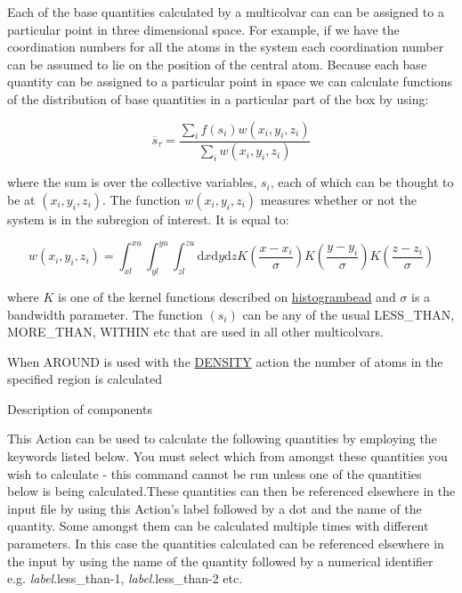Each of the base quantities calculated by a multicolvar can can be assigned to a particular point in three dimensional space. For example, if we have the coordination numbers for all the atoms in the system each coordination number can be assumed to lie on the position of the central atom. Because each base quantity can be assigned to a particular point in space we can calculate functions of the distribution of base quantities in a particular part of the box by using\+:

\[ \overline{s}_{\tau} = \frac{ \sum_i f(s_i) w(x_i,y_i,z_i) }{ \sum_i w(x_i,y_i,z_i) } \]

where the sum is over the collective variables, $s_i$, each of which can be thought to be at $ (x_i,y_i,z_i)$. The function $ w(x_i,y_i,z_i) $ measures whether or not the system is in the subregion of interest. It is equal to\+:

\[ w(x_i,y_i,z_i) = \int_{xl}^{xu} \int_{yl}^{yu} \int_{zl}^{zu} \textrm{d}x\textrm{d}y\textrm{d}z K\left( \frac{x - x_i}{\sigma} \right)K\left( \frac{y - y_i}{\sigma} \right)K\left( \frac{z - z_i}{\sigma} \right) \]

where $K$ is one of the kernel functions described on \hyperlink{histogrambead}{histogrambead} and $\sigma$ is a bandwidth parameter. The function $(s_i)$ can be any of the usual L\+E\+S\+S\+\_\+\+T\+H\+A\+N, M\+O\+R\+E\+\_\+\+T\+H\+A\+N, W\+I\+T\+H\+I\+N etc that are used in all other multicolvars.

When A\+R\+O\+U\+N\+D is used with the \hyperlink{DENSITY}{D\+E\+N\+S\+I\+T\+Y} action the number of atoms in the specified region is calculated

\begin{DoxyParagraph}{Description of components}

\end{DoxyParagraph}
This Action can be used to calculate the following quantities by employing the keywords listed below. You must select which from amongst these quantities you wish to calculate -\/ this command cannot be run unless one of the quantities below is being calculated.\+These quantities can then be referenced elsewhere in the input file by using this Action's label followed by a dot and the name of the quantity. Some amongst them can be calculated multiple times with different parameters. In this case the quantities calculated can be referenced elsewhere in the input by using the name of the quantity followed by a numerical identifier e.\+g. {\itshape label}.less\+\_\+than-\/1, {\itshape label}.less\+\_\+than-\/2 etc.

